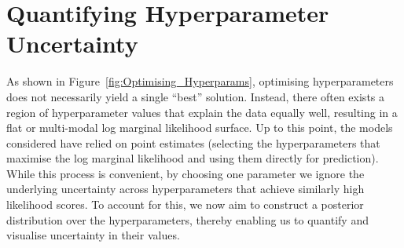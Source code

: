 \documentclass{ucdgradtaughtthesis}
\begin{document}
\section{Quantifying Hyperparameter Uncertainty}
\label{sec: MCMC}
As shown in Figure~\ref{fig:Optimising_Hyperparams}, optimising hyperparameters does not necessarily yield a single “best” solution. 
Instead, there often exists a region of hyperparameter values that explain the data equally well, resulting in a flat or multi-modal log marginal likelihood surface.
Up to this point, the models considered have relied on point estimates (selecting the hyperparameters that maximise the log marginal likelihood and using them directly for prediction). 
While this process is convenient, by choosing one parameter we ignore the underlying uncertainty across hyperparameters that achieve similarly high likelihood scores. 
To account for this, we now aim to construct a posterior distribution over the hyperparameters, thereby enabling us to quantify and visualise uncertainty in their values.
%
\end{document}

